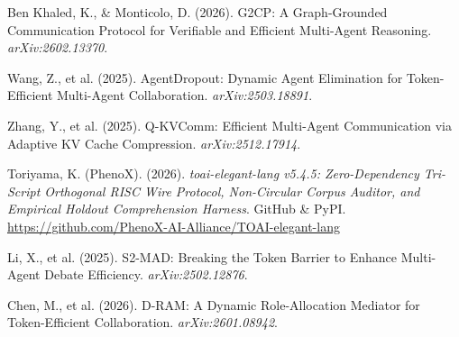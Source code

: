 \documentclass[9pt,a4paper]{extarticle}
\begin{document}
\begin{enumerate}[label={[\arabic*]},leftmargin=1.6em,itemsep=0.0pt,parsep=0pt,topsep=0.4pt]
  \item{\footnotesize Ben Khaled, K., \& Monticolo, D. (2026). G2CP: A Graph-Grounded Communication Protocol for Verifiable and Efficient Multi-Agent Reasoning. \emph{arXiv:2602.13370}.}
  \item{\footnotesize Wang, Z., et al. (2025). AgentDropout: Dynamic Agent Elimination for Token-Efficient Multi-Agent Collaboration. \emph{arXiv:2503.18891}.}
  \item{\footnotesize Zhang, Y., et al. (2025). Q-KVComm: Efficient Multi-Agent Communication via Adaptive KV Cache Compression. \emph{arXiv:2512.17914}.}
  \item{\footnotesize Toriyama, K. (PhenoX). (2026). \emph{toai-elegant-lang v5.4.5: Zero-Dependency Tri-Script Orthogonal RISC Wire Protocol, Non-Circular Corpus Auditor, and Empirical Holdout Comprehension Harness}. GitHub \& PyPI. \url{https://github.com/PhenoX-AI-Alliance/TOAI-elegant-lang}}
  \item{\footnotesize Li, X., et al. (2025). S2-MAD: Breaking the Token Barrier to Enhance Multi-Agent Debate Efficiency. \emph{arXiv:2502.12876}.}
  \item{\footnotesize Chen, M., et al. (2026). D-RAM: A Dynamic Role-Allocation Mediator for Token-Efficient Collaboration. \emph{arXiv:2601.08942}.}
\end{enumerate}
\end{document}
